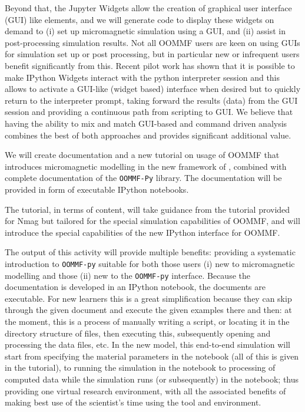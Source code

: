 \begin{workpackage}
\begin{tasklist}
\begin{task}[title=OOMMF case study: Extend \texttt{OOMMF-py} with IPython
    notebook attributes and GUI templates]
  Beyond that, the Jupyter Widgets allow the creation of graphical
  user interface (GUI) like elements, and we will generate code to
  display these widgets on demand to (i) set up micromagnetic
  simulation using a GUI, and (ii) assist in post-processing
  simulation results. Not all OOMMF users are keen on using GUIs for
  simulation set up or post processing, but in particular new or
  infrequent users benefit significantly from this. Recent pilot work
  has shown that it is possible to make IPython Widgets interact with
  the python interpreter session and this allows to activate a
  GUI-like (widget based) interface when desired but to quickly return
  to the interpreter prompt, taking forward the results (data) from
  the GUI session \cite{IPython-widget-GUI-demo-youtube-2014} and
  providing a continuous path from scripting to GUI. We
  believe that having the ability to mix and match GUI-based and
  command driven analysis combines the best of both approaches and
  provides significant additional value.
\end{task}

\begin{task}[title=OOMMF case study: \OOMMFNB{} tutorial and
  documentation, id=oommf-tutorial-and-documentation]

  We will create documentation and a new tutorial on usage of OOMMF
  that introduces micromagnetic modelling in the new framework of
  \OOMMFNB{}, combined with complete documentation of the
  \texttt{OOMMF-Py} library. The documentation will be provided in
  form of executable IPython notebooks.

  The tutorial, in terms of content, will take guidance from the
  tutorial provided for Nmag \cite{Nmag-tutorial-url} but tailored for the
  special simulation capabilities of OOMMF, and will introduce the
  special capabilities of the new IPython interface for OOMMF.

  The output of this activity will provide multiple benefits:
  providing a systematic introduction to \texttt{OOMMF-py} suitable for both
  those users (i) new to micromagnetic modelling and those (ii) new to
  the \texttt{OOMMF-py} interface. Because the documentation is developed in an
  IPython notebook, the documents are executable. For new learners
  this is a great simplification because they can skip through the
  given document and execute the given examples there and then: at the
  moment, this is a process of manually writing a script, or locating
  it in the directory structure of files, then executing this,
  subsequently opening and processing the data files, etc. In the new
  model, this end-to-end simulation will start from specifying the
  material parameters in the notebook (all of this is given in the
  tutorial), to running the simulation in the notebook to processing
  of computed data while the simulation runs (or subsequently) in the
  notebook; thus providing one virtual research environment, with all
  the associated benefits of making best use of the scientist's time
  using the tool and environment.


\end{task}
\end{tasklist}
\end{workpackage}
